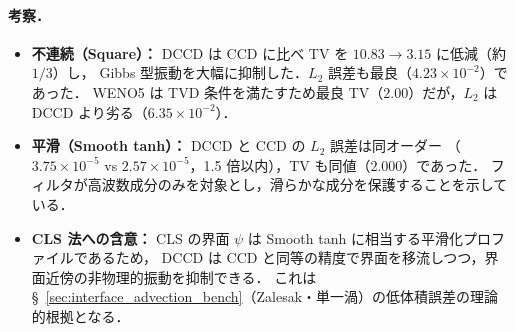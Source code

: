 \paragraph{考察．}
\begin{itemize}[noitemsep]
  \item \textbf{不連続（Square）：} DCCD は CCD に比べ TV を $10.83 \to 3.15$ に低減（約 $1/3$）し，
        Gibbs 型振動を大幅に抑制した．$L_2$ 誤差も最良（$4.23\times10^{-2}$）であった．
        WENO5 は TVD 条件を満たすため最良 TV（$2.00$）だが，$L_2$ は DCCD より劣る（$6.35\times10^{-2}$）．
  \item \textbf{平滑（Smooth tanh）：} DCCD と CCD の $L_2$ 誤差は同オーダー
        （$3.75\times10^{-5}$ vs $2.57\times10^{-5}$，1.5 倍以内），TV も同値（$2.000$）であった．
        フィルタが高波数成分のみを対象とし，滑らかな成分を保護することを示している．
  \item \textbf{CLS 法への含意：} CLS の界面 $\psi$ は Smooth tanh に相当する平滑化プロファイルであるため，
        DCCD は CCD と同等の精度で界面を移流しつつ，界面近傍の非物理的振動を抑制できる．
        これは §~\ref{sec:interface_advection_bench}（Zalesak・単一渦）の低体積誤差の理論的根拠となる．
\end{itemize}
